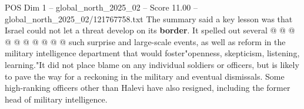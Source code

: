 \begin{textsample}{POS Dim 1 – global\_north\_2025\_02 – Score 11.00 – global\_north\_2025\_02/121767758.txt}
The summary said a key lesson was that Israel could not let a threat develop on its \textbf{border}.
It spelled out several @ @ @ @ @ @ @ @ @ @ such surprise and large-scale events, as well as reform in the military intelligence department that would foster"openness, skepticism, listening, learning."It did not place blame on any individual soldiers or officers, but is likely to pave the way for a reckoning in the military and eventual dismissals.
Some high-ranking officers other than Halevi have also resigned, including the former head of military intelligence.

\end{textsample}
